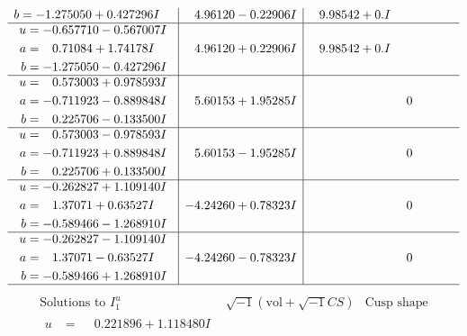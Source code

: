 \documentclass[1p]{elsarticle_modified}
\theoremstyle{definition}
\newcommand{\I}{\sqrt{-1}}
\begin{document}
$$\begin{array}{c|c|c}
\begin{aligned}
b &= -1.275050 + 0.427296 I\end{aligned}
 & \phantom{-}4.96120 - 0.22906 I & \phantom{-}9.98542 + 0. I\phantom{ +0.000000I} \\ \hline\begin{aligned}
u &= -0.657710 - 0.567007 I \\
a &= \phantom{-}0.71084 + 1.74178 I \\
b &= -1.275050 - 0.427296 I\end{aligned}
 & \phantom{-}4.96120 + 0.22906 I & \phantom{-}9.98542 + 0. I\phantom{ +0.000000I} \\ \hline\begin{aligned}
u &= \phantom{-}0.573003 + 0.978593 I \\
a &= -0.711923 - 0.889848 I \\
b &= \phantom{-}0.225706 - 0.133500 I\end{aligned}
 & \phantom{-}5.60153 + 1.95285 I & \phantom{-0.000000 } 0 \\ \hline\begin{aligned}
u &= \phantom{-}0.573003 - 0.978593 I \\
a &= -0.711923 + 0.889848 I \\
b &= \phantom{-}0.225706 + 0.133500 I\end{aligned}
 & \phantom{-}5.60153 - 1.95285 I & \phantom{-0.000000 } 0 \\ \hline\begin{aligned}
u &= -0.262827 + 1.109140 I \\
a &= \phantom{-}1.37071 + 0.63527 I \\
b &= -0.589466 - 1.268910 I\end{aligned}
 & -4.24260 + 0.78323 I & \phantom{-0.000000 } 0 \\ \hline\begin{aligned}
u &= -0.262827 - 1.109140 I \\
a &= \phantom{-}1.37071 - 0.63527 I \\
b &= -0.589466 + 1.268910 I\end{aligned}
 & -4.24260 - 0.78323 I & \phantom{-0.000000 } 0\\
 \hline 
 \end{array}$$\newpage$$\begin{array}{c|c|c}  
\text{Solutions to }I^u_{1}& \I (\text{vol} + \sqrt{-1}CS) & \text{Cusp shape}\\
 \hline 
\begin{aligned}
u &= \phantom{-}0.221896 + 1.118480 I \\

\end{aligned}
\end{array}$$
\end{document}
